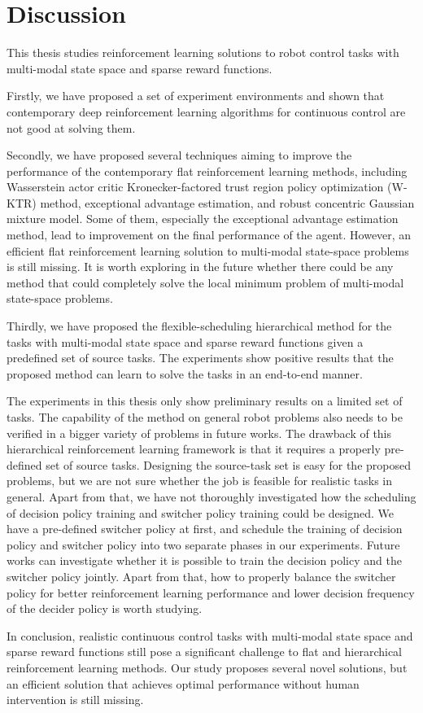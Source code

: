\chapter{Discussion}
This thesis studies reinforcement learning solutions to robot control tasks with multi-modal state space and sparse reward functions.

Firstly, we have proposed a set of experiment environments and shown that contemporary deep reinforcement learning algorithms for continuous control are not good at solving them. 

Secondly, we have proposed several techniques aiming to improve the performance of the contemporary flat reinforcement learning methods, including Wasserstein actor critic Kronecker-factored trust region policy optimization (W-KTR) method, exceptional advantage estimation, and robust concentric Gaussian mixture model. Some of them, especially the exceptional advantage estimation method, lead to improvement on the final performance of the agent. However, an efficient flat reinforcement learning solution to multi-modal state-space problems is still missing. It is worth exploring in the future whether there could be any method that could completely solve the local minimum problem of multi-modal state-space problems.

Thirdly, we have proposed the flexible-scheduling hierarchical method for the tasks with multi-modal state space and sparse reward functions given a predefined set of source tasks. The experiments show positive results that the proposed method can learn to solve the tasks in an end-to-end manner.

The experiments in this thesis only show preliminary results on a limited set of tasks. The capability of the method on general robot problems also needs to be verified in a bigger variety of problems in future works. The drawback of this hierarchical reinforcement learning framework is that it requires a properly pre-defined set of source tasks. Designing the source-task set is easy for the proposed problems, but we are not sure whether the job is feasible for realistic tasks in general. Apart from that, we have not thoroughly investigated how the scheduling of decision policy training and switcher policy training could be designed. We have a pre-defined switcher policy at first, and schedule the training of decision policy and switcher policy into two separate phases in our experiments. Future works can investigate whether it is possible to train the decision policy and the switcher policy jointly. Apart from that, how to properly balance the switcher policy for better reinforcement learning performance and lower decision frequency of the decider policy is worth studying.

In conclusion, realistic continuous control tasks with multi-modal state space and sparse reward functions still pose a significant challenge to flat and hierarchical reinforcement learning methods. Our study proposes several novel solutions, but an efficient solution that achieves optimal performance without human intervention is still missing.